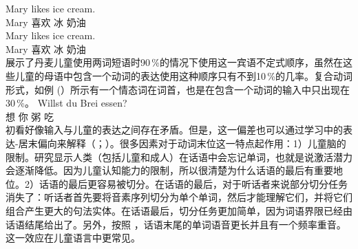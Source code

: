 \eal
\ex 
\gll Mary likes ice cream.\\
	 Mary 喜欢 冰 奶油\\
\ex 
\gll Mary likes ice cream.\\
	 Mary 喜欢 冰 奶油\\
\zl
 \citet*[]{WKG2001a}展示了丹麦儿童使用两词短语时90\,\%的情况下使用这一宾语不定式顺序，虽然在这些儿童的母语中包含一个动词的表达使用这种顺序只有不到10\,\%的几率。复合动词形式，如例 (）所示有一个情态词在词首，也是在包含一个动词的输入中只出现在30\,\%\citep*[]{WKG2001a}。
\ea
\gll Willst du Brei essen?\\
     想   你 粥 吃\\
\z
初看好像输入与儿童的表达之间存在矛盾。但是，这一偏差也可以通过学习中的表达-居末偏向来解释（\citealp{WKG2001a}；\citealp*{FPG2006a}）。很多因素对于动词末位这一特点起作用：1）儿童脑的限制。研究显示人类（包括儿童和成人）在话语中会忘记单词，也就是说激活潜力会逐渐降低。因为儿童认知能力的限制，所以很清楚为什么话语的最后有重要地位。2）话语的最后更容易被切分。在话语的最后，对于听话者来说部分切分任务消失了：听话者首先要将音素序列切分为单个单词，然后才能理解它们，并将它们组合产生更大的句法实体。在话语最后，切分任务更加简单，因为词语界限已经由话语结尾给出了。另外，按照 \citet*[]{WKG2001a}，话语末尾的单词语音更长并且有一个频率重音。这一效应在儿童语言中更常见。
